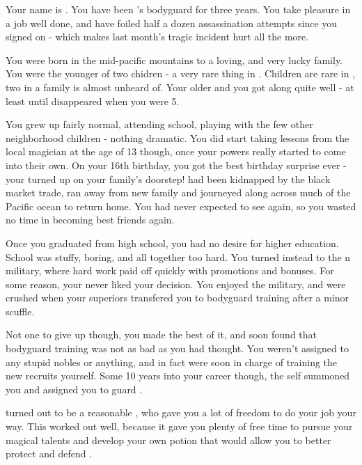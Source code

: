 \documentclass[char]{NeptuneBall}
\begin{document}
\name{\cBodyguard{}}

Your name is \cBodyguard{}. You have been \cPrince{}'s bodyguard for three years. You take pleasure in a job well done, and have foiled half a dozen assassination attempts since you signed on - which makes last month's tragic incident hurt all the more.

You were born in the mid-pacific mountains to a loving, and very lucky family. You were the younger of two chidren - a very rare thing in \pPacifica{}. Children are rare in \pPacifica{}, two in a family is almost unheard of. Your older \cSpy{\sibling} \cSpy{} and you got along quite well - at least until \cSpy{\they} disappeared when you were 5.

You grew up fairly normal, attending school, playing with the few other neighborhood children - nothing dramatic. You did start taking lessons from the local magician at the age of 13 though, once your powers really started to come into their own. On your 16th birthday, you got the best birthday surprise ever - your \cSpy{\sibling} turned up on your family's doorstep! \cSpy{\They} had been kidnapped by the black market trade, ran away from \cSpy{\their} new family and journeyed along across much of the Pacific ocean to return home. You had never expected to see \cSpy{\them} again, so you wasted no time in becoming best friends again.

Once you graduated from high school, you had no desire for higher education. School was stuffy, boring, and all together too hard. You turned instead to the \pPacifica{}n military, where hard work paid off quickly with promotions and bonuses. For some reason, your \cSpy{\sibling} never liked your decision. You enjoyed the military, and were crushed when your superiors transfered you to bodyguard training after a minor scuffle.

Not one to give up though, you made the best of it, and soon found that bodyguard training was not as bad as you had thought. You weren't assigned to any stupid nobles or anything, and in fact were soon in charge of training the new recruits yourself. Some 10 years into your career though, the \cPacificanRuler{\King} \cPacificanRuler{\them}self summoned you and assigned you to guard \cPacificanRuler{\them} \cPrince{\offspring} \cPrince{}.

\cPrince{} turned out to be a reasonable \cPrince{\guy}, who gave you a lot of freedom to do your job your way. This worked out well, because it gave you plenty of free time to pursue your magical talents and develop your own potion that would allow you to better protect and defend \cPrince{\them}.
\end{document}
